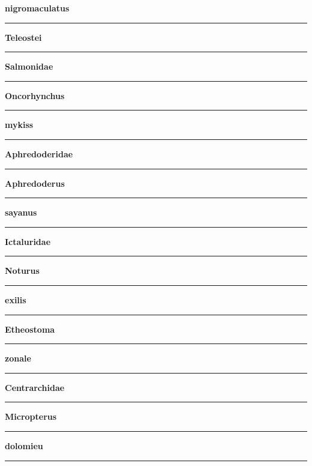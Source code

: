 \documentclass[11pt]{exam}
\newcommand*\Matching[1]{
\ifprintanswers
	\textbf{#1}
\else
	\rule{2.1in}{0.4pt}
\fi
}
\newlength\matchlena
\newlength\matchlenb
\newcommand\MatchQuestion[2]{%
	\setlength\matchlenb{\linewidth}
	\addtolength\matchlenb{-\matchlena}
	\parbox[t]{\matchlena}{\Matching{#1}}\enspace\parbox[t]{\matchlenb}{#2}}
\begin{document}
\begin{questions}
\begin{multicols}{2}
\question\MatchQuestion{nigromaculatus}{}
\columnbreak

\question\MatchQuestion{Teleostei}{}
\vspace{1.5\baselineskip}

\question\MatchQuestion{Salmonidae}{}
\vspace{1.5\baselineskip}

\question\MatchQuestion{Oncorhynchus}{}
\vspace{1.5\baselineskip}

\question\MatchQuestion{mykiss}{}
\vspace{1.5\baselineskip}

\question\MatchQuestion{Aphredoderidae}{}
\vspace{1.5\baselineskip}

\question\MatchQuestion{Aphredoderus}{}
\vspace{1.5\baselineskip}

\question\MatchQuestion{sayanus}{}
\vspace{1.5\baselineskip}

\question\MatchQuestion{Ictaluridae}{}
\vspace{1.5\baselineskip}

\question\MatchQuestion{Noturus}{}
\vspace{1.5\baselineskip}

\question\MatchQuestion{exilis}{}
\vspace{1.5\baselineskip}

\question\MatchQuestion{Etheostoma}{}
\vspace{1.5\baselineskip}

\question\MatchQuestion{zonale}{}
\vspace{1.5\baselineskip}

\question\MatchQuestion{Centrarchidae}{}
\vspace{1.5\baselineskip}

\question\MatchQuestion{Micropterus}{}
\vspace{1.5\baselineskip}

\question\MatchQuestion{dolomieu}{}
\vspace{1.5\baselineskip}

\end{multicols}
\newpage


\end{questions}
\end{document}
